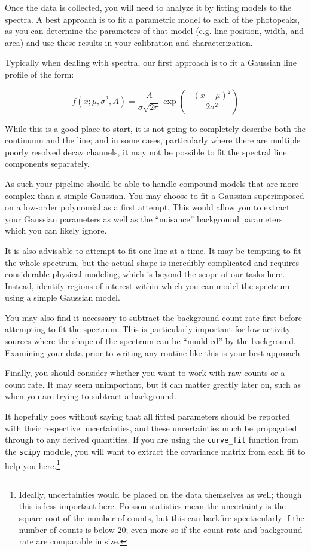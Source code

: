 \documentclass{tufte-book}
\begin{document}
Once the data is collected, you will need to analyze it by fitting models to the spectra. A best approach is to fit a parametric model to each of the photopeaks, as you can determine the parameters of that model (e.g. line position, width, and area) and use these results in your calibration and characterization.

Typically when dealing with spectra, our first approach is to fit a Gaussian line profile of the form:

\begin{equation}
    f\left(x; \mu, \sigma^2, A\right) = \frac{A}{\sigma \sqrt{2\pi}}\exp \left(-\frac{(x - \mu)^2}{2\sigma^2}\right)
\end{equation}

\noindent While this is a good place to start, it is not going to completely describe both the continuum and the line; and in some cases, particularly where there are multiple poorly resolved decay channels, it may not be possible to fit the spectral line components separately.

As such your pipeline should be able to handle compound models that are more complex than a simple Gaussian. You may choose to fit a Gaussian superimposed on a low-order polynomial as a first attempt. This would allow you to extract your Gaussian parameters as well as the ``nuisance'' background parameters which you can likely ignore.

It is also advisable to attempt to fit one line at a time. It may be tempting to fit the whole spectrum, but the actual shape is incredibly complicated and requires considerable physical modeling, which is beyond the scope of our tasks here. Instead, identify regions of interest within which you can model the spectrum using a simple Gaussian model.

You may also find it necessary to subtract the background count rate first before attempting to fit the spectrum. This is particularly important for low-activity sources where the shape of the spectrum can be ``muddied'' by the background. Examining your data prior to writing any routine like this is your best approach.

Finally, you should consider whether you want to work with raw counts or a count rate. It may seem unimportant, but it can matter greatly later on, such as when you are trying to subtract a background.

It hopefully goes without saying that all fitted parameters should be reported with their respective uncertainties, and these uncertainties much be propagated through to any derived quantities. If you are using the \verb|curve_fit| function from the \verb|scipy| module, you will want to extract the covariance matrix from each fit to help you here.\footnote{Ideally, uncertainties would be placed on the data themselves as well; though this is less important here. Poisson statistics mean the uncertainty is the square-root of the number of counts, but this can backfire spectacularly if the number of counts is below 20; even more so if the count rate and background rate are comparable in size.}
\end{document}
